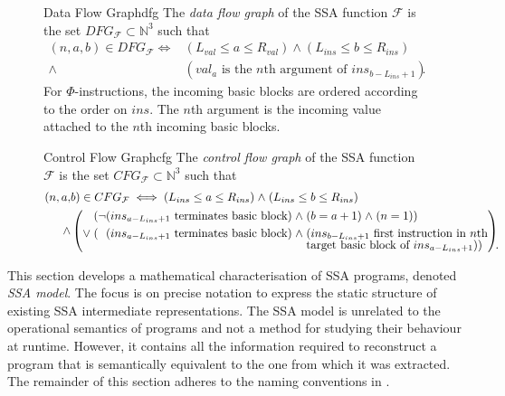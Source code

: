 \begin{figure}[p]
\begin{definition}{Data Flow Graph}{dfg}
    The {\em data flow graph} of the SSA function $\mathcal F$ is the set
    $DFG_{\mathcal F}\subset \mathbb N^3$ such that
    \begin{align*}
        (n,a,b)\in DFG_{\mathcal F}\iff{}&\left(L_{val}\leq a\leq R_{val}\right)
            \mathrel{\land}\left(L_{ins}\leq b\leq R_{ins}\right)\\
            \mathrel{\land}{}&(val_a\text{ is the $n$th argument of }ins_{b-L_{ins}+1}).
    \end{align*}
    For $\Phi$-instructions, the incoming basic blocks are ordered according to
    the order on $ins$.
    The $n$th argument is the incoming value attached to the $n$th incoming
    basic blocks.
\end{definition}
\begin{definition}{Control Flow Graph}{cfg}
    The {\em control flow graph} of the SSA function $\mathcal F$ is the set
    $CFG_{\mathcal F}\subset \mathbb N^3$ such that
    \begin{align*}
        (n,a,&{}b)\in CFG_{\mathcal F}\iff\left(L_{ins}\leq a\leq R_{ins}\right)\mathrel\land\left(L_{ins}\leq b\leq R_{ins}\right)\\
               \mathrel{\land}&\left(\begin{aligned}[c]
                                    (\neg (ins_{a-L_{ins}+1}\text{ terminates basic block})\mathrel\land{}&(b=a+1)\mathrel\land(n=1))\\
                      \mathrel{\lor}(\phantom{\neg}(ins_{a-L_{ins}+1}\text{ terminates basic block})\mathrel\land{}&(ins_{b-L_{ins}+1}\text{ first instruction in}\text{ $n$th}\\[-0.5em]
                                                   &\text{target basic block of }ins_{a-L_{ins}+1}))\hspace{4mm}.\hspace{-4mm}
        \end{aligned}\right)
    \end{align*}
\end{definition}
\end{figure}

    This section develops a mathematical characterisation of SSA programs,
    denoted {\em SSA model}.
    The focus is on precise notation to express the static structure of existing
    SSA intermediate representations.
    The SSA model is unrelated to the operational semantics of programs and not
    a method for studying their behaviour at runtime.
    However, it contains all the information required to reconstruct a program
    that is semantically equivalent to the one from which it was extracted.
    The remainder of this section adheres to the naming conventions in
    .

